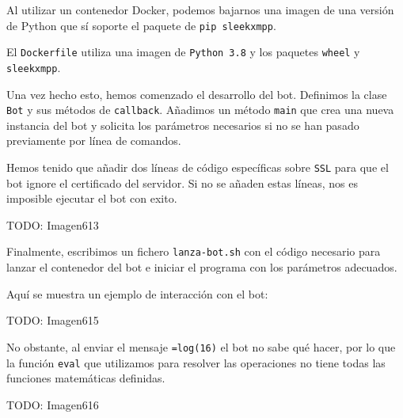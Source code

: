 Al utilizar un contenedor Docker, podemos bajarnos una imagen de una versión de Python que sí soporte
el paquete de \lstinline{pip sleekxmpp}.

El \lstinline{Dockerfile} utiliza una imagen de \lstinline{Python 3.8}
y los paquetes \lstinline{wheel} y \lstinline{sleekxmpp}.

Una vez hecho esto, hemos comenzado el desarrollo del bot.
Definimos la clase \lstinline{Bot} y sus métodos de \lstinline{callback}.
Añadimos un método \lstinline{main} que crea una nueva instancia del bot
y solicita los parámetros necesarios si no se han pasado previamente
por línea de comandos.

Hemos tenido que añadir dos líneas de código específicas sobre \lstinline{SSL}
para que el bot ignore el certificado del servidor.
Si no se añaden estas líneas, nos es imposible ejecutar el bot con exito.

TODO: Imagen613

Finalmente, escribimos un fichero \lstinline{lanza-bot.sh} con el código necesario
para lanzar el contenedor del bot e iniciar el programa con los parámetros adecuados.

Aquí se muestra un ejemplo de interacción con el bot:

TODO: Imagen615

No obstante, al enviar el mensaje \verb#=log(16)#
el bot no sabe qué hacer, por lo que la función \verb#eval#
que utilizamos para resolver las operaciones no tiene todas
las funciones matemáticas definidas.

TODO: Imagen616

